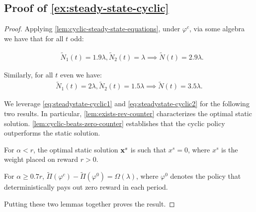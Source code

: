 \documentclass[12pt]{article}
\begin{document}
\subsection{Proof of \cref{ex:steady-state-cyclic}}\label{apx:cyclic-diff-dist}



\begin{proof}
Applying \cref{lem:cyclic-steady-state-equations}, under $\varphi^c$, via some algebra we have that for all $t$ odd:
{
\begin{align}\label{eq:steadystate-cyclic1}
    &\widetilde{N}_1(t) = 1.9\lambda,
    \widetilde{N}_2(t) = \lambda 
    \implies  \widetilde{N}(t) = 2.9\lambda.
\end{align}

Similarly, for all $t$ even we have:
\begin{align}\label{eq:steadystate-cyclic2}
    \widetilde{N}_1(t) = 2\lambda,
    \widetilde{N}_2(t) = 1.5\lambda
    \implies \widetilde{N}(t) = 3.5\lambda.
\end{align}
}



We leverage \eqref{eq:steadystate-cyclic1} and \eqref{eq:steadystate-cyclic2} for the following two results. In particular, \cref{lem:exists-rev-counter} characterizes the optimal static solution. \cref{lem:cyclic-beats-zero-counter} establishes that the cyclic policy outperforms the static solution.
\begin{lemma}\label{lem:exists-rev-counter}
For $\alpha < r$, the optimal static solution $\mathbf{x}^s$ is such that $x^s = 0$, where $x^s$ is the weight placed on reward $r > 0$.
\end{lemma}

\begin{lemma}\label{lem:cyclic-beats-zero-counter}
For $\alpha \geq 0.7r$, $\widetilde{\Pi}(\varphi^c) - \widetilde{\Pi}(\varphi^0)  = \Omega(\lambda)$, where $\varphi^0$ denotes the policy that deterministically pays out zero reward in each period.
\end{lemma}

 Putting these two lemmas together proves the result.
 \end{proof}
 
\end{document}
